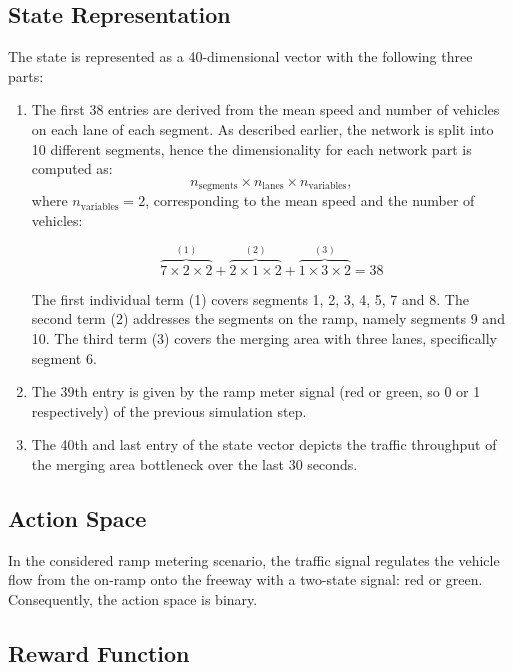 \subsection{State Representation}

The state is represented as a 40-dimensional vector with the following three parts: 

\begin{enumerate}
    \item The first 38 entries are derived from the mean speed and number of vehicles on each lane of each segment. As described earlier, the network is split into 10 different segments, hence the dimensionality for each network part is computed as:
    \[
    n_{\mathrm{segments}} \times n_{\mathrm{lanes}} \times n_{\mathrm{variables}},
    \]
    where \(n_{\mathrm{variables}} = 2\), corresponding to the mean speed and the number of vehicles: 


   \[
    \overbrace{7 \times 2 \times 2}^{(1)}
    +
    \overbrace{2 \times 1 \times 2}^{(2)}
    +
    \overbrace{1 \times 3 \times 2}^{(3)}
    = 38
    \]

    The first individual term (1) covers segments 1, 2, 3, 4, 5, 7 and 8.
    The second term (2) addresses the segments on the ramp, namely segments 9 and 10.
    The third term (3) covers the merging area with three lanes, specifically segment 6.


    \item The 39th entry is given by the ramp meter signal (red or green, so 0 or 1 respectively) of the previous simulation step. 

    \item The 40th and last entry of the state vector depicts the traffic throughput of the merging area bottleneck over the last 30 seconds.
\end{enumerate}

\subsection{Action Space}

In the considered ramp metering scenario, the traffic signal regulates the vehicle flow from the on-ramp onto the freeway with a two-state signal: red or green.
Consequently, the action space is binary. 

\subsection{Reward Function}

